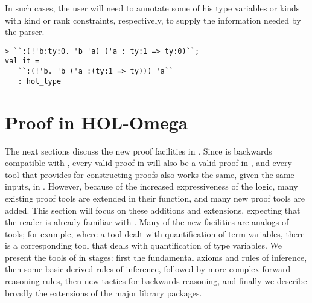 In such cases, the user will need to annotate some of his type variables or
kinds with kind or rank constraints, respectively,
to supply the information needed by the parser.
%
\begin{session}
\begin{verbatim}
> ``:(!'b:ty:0. 'b 'a) ('a : ty:1 => ty:0)``;
val it =
   ``:(!'b. 'b ('a :(ty:1 => ty))) 'a``
   : hol_type
\end{verbatim}
\end{session}






\section{Proof in HOL-Omega}


\setcounter{sessioncount}{0}

The next sections discuss the new proof facilities in \HOLW{}.
Since \HOLW{} is backwards compatible with \HOL, every valid proof
in \HOL{} will also be a valid proof in \HOLW, and every tool that
\HOL{} provides for constructing proofs also works the same, given
the same inputs, in \HOLW.  However, because of the increased expressiveness
of the \HOLW{} logic, many existing proof tools are extended in their 
function, and many new proof tools are added.  This section will focus
on these additions and extensions, expecting that the reader is already
familiar with \HOL{}.  Many of the new facilities
are analogs of \HOL{} tools; for example, where a \HOL{} tool dealt with
quantification of term variables, there is a corresponding \HOLW{} tool
that deals with quantification of type variables.
%
We present the tools of \HOLW{} in stages: first the fundamental 
axioms and rules of inference, then some basic derived rules of inference, 
followed by more complex forward reasoning rules, then new tactics for backwards
reasoning, and finally we describe broadly the extensions of the major
library packages.

